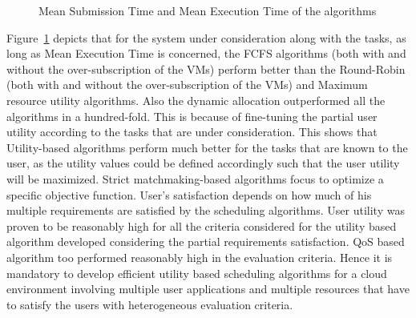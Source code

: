 \documentclass[times, 10pt,twocolumn]{article}
\begin{document}
\begin{figure}[ht]
 \caption{Mean Submission Time and Mean Execution Time of the algorithms}
 \label{fig:met}
\end{figure}

Figure~\ref{fig:met} depicts that for the system under consideration along with the tasks, as long as Mean Execution Time is concerned, the FCFS algorithms (both with and without the over-subscription of the VMs) perform better than the Round-Robin (both with and without the over-subscription of the VMs) and Maximum resource utility algorithms. Also the dynamic allocation outperformed all the algorithms in a hundred-fold. This is because of fine-tuning the partial user utility according to the tasks that are under consideration. This shows that Utility-based algorithms perform much better for the tasks that are known to the user, as the utility values could be defined accordingly such that the user utility will be maximized. 
Strict matchmaking-based algorithms focus to optimize a specific objective function. User's satisfaction depends on how much of his multiple requirements are satisfied by the scheduling algorithms. User utility was proven to be reasonably high for all the criteria considered for the utility based algorithm developed considering the partial requirements satisfaction. QoS based algorithm too performed reasonably high in the evaluation criteria. Hence it is mandatory to develop efficient utility based scheduling algorithms for a cloud environment involving multiple user applications and multiple resources that have to satisfy the users with heterogeneous evaluation criteria.
\end{document}
